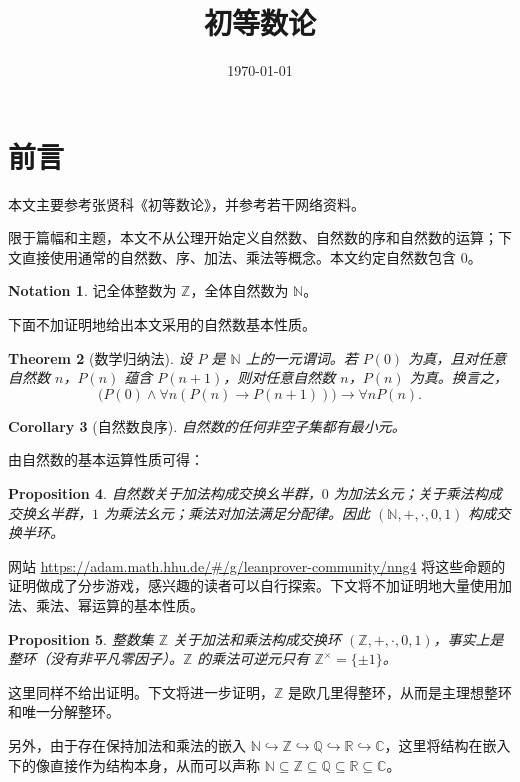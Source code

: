 \documentclass[a4paper,11pt]{ctexart}
\title{初等数论}
\author{}
\date{\today}
\numberwithin{equation}{section}
\theoremstyle{plain}
\newtheorem{theorem}{Theorem}[section]
\newtheorem{proposition}[theorem]{Proposition}
\newtheorem{corollary}[theorem]{Corollary}
\theoremstyle{definition}
\newtheorem{notation}[theorem]{Notation}
\theoremstyle{remark}
\newcommand{\Z}{\mathbb{Z}}
\newcommand{\Q}{\mathbb{Q}}
\newcommand{\R}{\mathbb{R}}
\newcommand{\C}{\mathbb{C}}
\newcommand{\N}{\mathbb{N}}
\begin{document}
\maketitle
\tableofcontents
\newpage

\setcounter{section}{-1}

\section{前言}

本文主要参考张贤科《初等数论》，并参考若干网络资料。

限于篇幅和主题，本文不从公理开始定义自然数、自然数的序和自然数的运算；下文直接使用通常的自然数、序、加法、乘法等概念。本文约定自然数包含 \(0\)。

\begin{notation}
    记全体整数为 \(\Z\)，全体自然数为 \(\N\)。
\end{notation}

下面不加证明地给出本文采用的自然数基本性质。

\begin{theorem}[数学归纳法]
    设 \(P\) 是 \(\N\) 上的一元谓词。若 \(P(0)\) 为真，且对任意自然数 \(n\)，\(P(n)\) 蕴含 \(P(n+1)\)，则对任意自然数 \(n\)，\(P(n)\) 为真。换言之，
    \[
    \bigl(P(0)\land \forall n(P(n)\to P(n+1))\bigr)
    \to \forall nP(n). 
    \]
\end{theorem}

\begin{corollary}[自然数良序]
    自然数的任何非空子集都有最小元。
\end{corollary}

由自然数的基本运算性质可得：

\begin{proposition}
    自然数关于加法构成交换幺半群，\(0\) 为加法幺元；关于乘法构成交换幺半群，\(1\) 为乘法幺元；乘法对加法满足分配律。因此 \((\N,+,\cdot,0,1)\) 构成交换半环。
\end{proposition}

网站 \url{https://adam.math.hhu.de/#/g/leanprover-community/nng4} 将这些命题的证明做成了分步游戏，感兴趣的读者可以自行探索。下文将不加证明地大量使用加法、乘法、幂运算的基本性质。

\begin{proposition}
    整数集 \(\Z\) 关于加法和乘法构成交换环 \((\Z,+,\cdot,0,1)\)，事实上是整环（没有非平凡零因子）。\(\Z\) 的乘法可逆元只有 \(\Z^\times=\{\pm1\}\)。
\end{proposition}

这里同样不给出证明。下文将进一步证明，\(\Z\) 是欧几里得整环，从而是主理想整环和唯一分解整环。

另外，由于存在保持加法和乘法的嵌入 \(\N \hookrightarrow \Z \hookrightarrow \Q \hookrightarrow \R \hookrightarrow \C\)，这里将结构在嵌入下的像直接作为结构本身，从而可以声称 \(\N \subseteq \Z \subseteq \Q \subseteq \R \subseteq \C\)。
\end{document}
